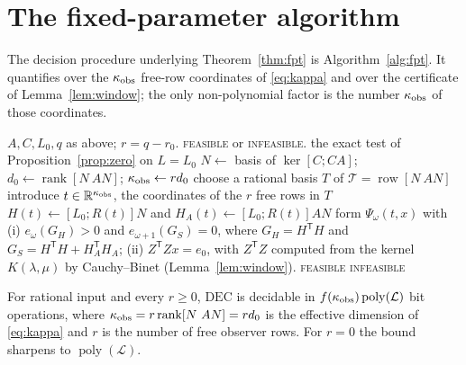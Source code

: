 \section{The fixed-parameter algorithm}\label{sec:fpt}

The decision procedure underlying Theorem~\ref{thm:fpt} is
Algorithm~\ref{alg:fpt}. It quantifies over the $\kappa_{\rm obs}$ free-row
coordinates of \eqref{eq:kappa} and over the certificate of
Lemma~\ref{lem:window}; the only non-polynomial factor is the number
$\kappa_{\rm obs}$ of those coordinates.

\begin{algorithm}[!t]
\caption{Deciding $\mathrm{DEC}(q)$ in time $f(\kappa_{\rm obs})\operatorname{poly}(\mathcal L)$}
\label{alg:fpt}
\begin{algorithmic}[1]
\Require $A,C,L_0,q$ as above; $r=q-r_0$.
\Ensure \textsc{feasible} or \textsc{infeasible}.
  \State \Return the exact test of Proposition~\ref{prop:zero} on $L=L_0$
\EndIf
\State $N\gets$ basis of $\ker[C;CA]$;\quad $d_0\gets\operatorname{rank}[N\ AN]$;\quad
$\kappa_{\rm obs}\gets rd_0$
\State choose a rational basis $T$ of $\mathcal T=\operatorname{row}[N\ AN]$
\State introduce $t\in\mathbb R^{\kappa_{\rm obs}}$, the coordinates of the $r$ free rows in $T$
\State $H(t)\gets[L_0;R(t)]N$ and $H_A(t)\gets[L_0;R(t)]AN$
  \State form $\Psi_\omega(t,x)$ with
  \Statex \quad (i) $e_\omega(G_H)>0$ and $e_{\omega+1}(G_S)=0$, where
           $G_H=H^{\mathsf T}H$ and $G_S=H^{\mathsf T}H+H_A^{\mathsf T}H_A$;
  \Statex \quad (ii) $Z^{\mathsf T}Zx=e_0$, with $Z^{\mathsf T}Z$ computed from the kernel
           $K(\lambda,\mu)$ by Cauchy--Binet (Lemma~\ref{lem:window}).
    \State \Return \textsc{feasible}
  \EndIf
\EndFor
\State \Return \textsc{infeasible}
\end{algorithmic}
\end{algorithm}

\begin{thm}\label{thm:fpt}
For rational input and every $r\ge0$, $\mathrm{DEC}$ is decidable in
$f(\kappa_{\rm obs})\operatorname{poly}(\mathcal L)$ bit operations, where
$\kappa_{\rm obs}=r\operatorname{rank}[N\ AN]=r d_0$ is the effective dimension
of \eqref{eq:kappa} and $r$ is the number of free observer rows. For $r=0$ the
bound sharpens to $\operatorname{poly}(\mathcal L)$.
\end{thm}

